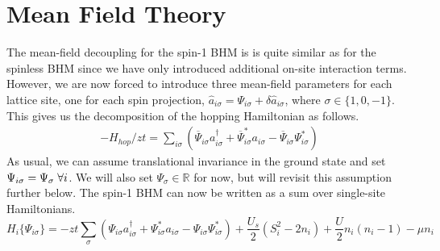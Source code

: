 \section{Mean Field Theory}
The mean-field decoupling for the spin-1 BHM is is quite similar as for the spinless BHM since we have only introduced additional on-site interaction terms. However, we are now forced to introduce three mean-field parameters for each lattice site, one for each spin projection, $\hat{a}_{i\sigma} = \Psi_{i\sigma} + \delta \hat{a}_{i\sigma}$, where $\sigma \in \{1, 0, -1\}$. This gives us the decomposition of the hopping Hamiltonian as follows.
\begin{align}
    -H_{hop}/zt = \sum_{i\sigma} (\overline{\Psi}_{i\sigma} a_{i\sigma}^{\dagger} + \overline{\Psi}_{i\sigma}^* a_{i\sigma} - \overline{\Psi}_{i\sigma}\Psi_{i\sigma}^*)
\end{align}
As usual, we can assume translational invariance in the ground state and set $\Psi_{i\sigma} = \Psi_{\sigma} \hspace{0.1cm} \forall i$. We will also set $\Psi_{\sigma} \in \mathbb{R}$ for now, but will revisit this assumption further below. The spin-1 BHM can now be written as a sum over single-site Hamiltonians.
\begin{equation}
    H_i\{\Psi_{i\sigma}\} = -zt\sum_{\sigma}(\Psi_{i\sigma} a_{i\sigma}^{\dagger} + \Psi_{i\sigma}^* a_{i\sigma} - \Psi_{i\sigma}\Psi_{i\sigma}^*) + \frac{U_s}{2}(S_i^2 - 2n_i) + \frac{U}{2}n_i(n_i - 1) - \mu n_i
\end{equation}

